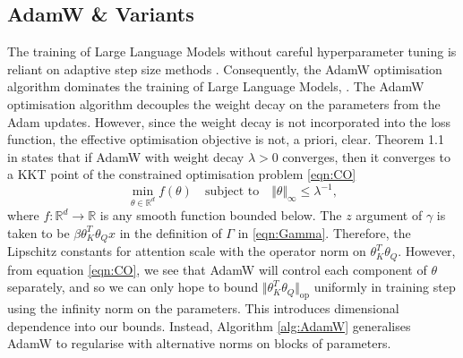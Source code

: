 \documentclass{article}
\begin{document}
\begin{appendices}
\section{AdamW \& Variants}\label{sec:AdamW}
The training of Large Language Models without careful hyperparameter tuning is reliant on adaptive step size methods \cite{zhao2025deconstructingmakesgoodoptimizer}. Consequently, the AdamW \cite{loshchilov2018decoupled} optimisation algorithm dominates the training of Large Language Models, \cite{deepseekai2025deepseekv3technicalreport,  grattafiori2024llama3herdmodels,brown2020languagemodelsfewshotlearners}. The AdamW optimisation algorithm decouples the weight decay on the parameters from the Adam updates. However, since the weight decay is not incorporated into the loss function, the effective optimisation objective is not, a priori, clear. Theorem 1.1 in \cite{pmlr-v235-xie24e} states that if AdamW with weight decay $\lambda>0$ converges, then it converges to a KKT point of the constrained optimisation problem \eqref{eqn:CO}
 \begin{equation}\label{eqn:CO}
     \min_{\theta \in \mathbb R^d} f(\theta) \quad \text{subject to} \quad \Vert \theta \Vert_{\infty} \le \lambda^{-1},
 \end{equation}
 where $f:\mathbb R^d\to \mathbb R$ is any smooth function bounded below. 
The $z$ argument of $\gamma$ is taken to be $\beta \theta_K^T\theta_Q x$ in the definition of $\Gamma$ in \eqref{eqn:Gamma}. Therefore, the Lipschitz constants for attention scale with the operator norm on $\theta_K^T\theta_Q$. However, from equation \eqref{eqn:CO}, we see that AdamW will control each component of $\theta$ separately, and so we can only hope to bound $\Vert \theta_K^T\theta_Q\Vert_\mathrm{op}$ uniformly in training step using the infinity norm on the parameters. This introduces dimensional dependence into our bounds. Instead, Algorithm \ref{alg:AdamW} generalises AdamW \cite{loshchilov2018decoupled} to regularise with alternative norms on blocks of parameters.\\
\begin{algorithm}
\caption{\textbf{Blockwise AdamW Optimisers \cite{xie2024adam}}\\
Blockwise AdamW optimisation algorithm, where the variance accumulator is performed on $\mathcal R(g)$. Here, each gradient $g$ lies in a finite-dimensional vector space $\mathscr{V}$ and $\mathcal R:\mathscr{V} \mapsto \mathscr{V}$. AdamW corresponds to $\mathcal R$ being the identity map.}\label{alg:AdamW}
\begin{algorithmic}[1]

\end{algorithmic}
\end{algorithm}
\end{appendices}
\end{document}

